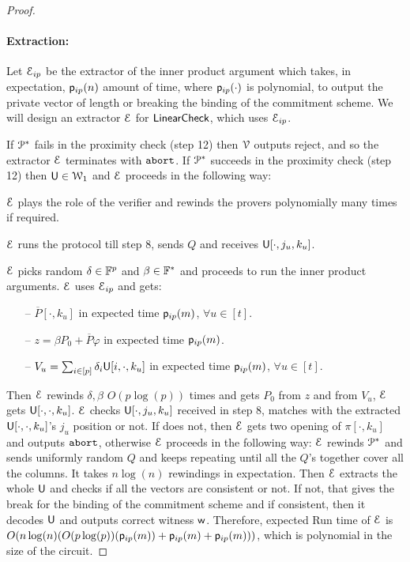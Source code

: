 \begin{proof}
	\smallskip
	\paragraph*{Extraction:} Let $\mathcal{E}_{ip}$ be the extractor of the inner product argument which takes, in expectation, $\mathsf{p}_{ip}(n)$ amount of time, where $\mathsf{p}_{ip}(\cdot)$ is polynomial, to output the private vector of length or breaking the binding of the commitment scheme. We will design an extractor $\mathcal{E}$ for $\mathsf{LinearCheck}$, which uses $\mathcal{E}_{ip}$.
	
	\smallskip
	If $\mathcal{P}^\ast$ fails in the proximity check (step 12) then $\mathcal{V}$ outputs reject, and so the extractor $\mathcal{E}$ terminates with $\texttt{abort}$.
	If $\mathcal{P}^\ast$ succeeds in the proximity check (step 12) then $\mathsf{U}\in \mathcal{W}_1$ and $\mathcal{E}$ proceeds in the following way:
	
	\smallskip
	$\mathcal{E}$ plays the role of the verifier and rewinds the provers polynomially many times if required.
	
	\smallskip
	$\mathcal{E}$ runs the protocol till step 8, sends $Q$ and receives $\mathsf{U}[\cdot, j_u,k_u]$. 
	
	$\mathcal{E}$ picks random $\delta\in \mathbb{F}^p$ and $\beta\in\mathbb{F}^\ast$ and proceeds to run the inner product arguments. $\mathcal{E}$ uses $\mathcal{E}_{ip}$ and gets:
	\begin{itemize}
		\item[--]  $\overline{P}[\cdot,k_u]$ in expected time $\mathsf{p}_{ip}(m)$, $\forall u\in[t]$.
		\item[--] $z=\beta P_0 + \overline{P}\varphi$ in expected time $\mathsf{p}_{ip}(m)$.
		\item[--] $V_u = \sum_{i\in[p]} \delta_i\mathsf{U}[i,\cdot,k_u]$ in expected time $\mathsf{p}_{ip}(m)$, $\forall u\in[t]$.
	\end{itemize}
	Then $\mathcal{E}$ rewinds $\delta, \beta$ $O(p\log(p))$ times and gets $P_0$ from $z$ and from $V_u$, $\mathcal{E}$ gets $\mathsf{U}[\cdot,\cdot,k_u]$. $\mathcal{E}$ checks $\mathsf{U}[\cdot,j_u,k_u]$ received in step 8, matches with the extracted $\mathsf{U}[\cdot,\cdot,k_u]$'s $j_u$ position or not. If does not, then $\mathcal{E}$ gets two opening of $\pi[\cdot,k_u]$ and outputs $\texttt{abort}$, otherwise $\mathcal{E}$ proceeds in the following way: $\mathcal{E}$ rewinds $\mathcal{P}^\ast$ and sends uniformly random $Q$ and keeps repeating until all the $Q$'s together cover all the columns. It takes $n\log(n)$ rewindings in expectation. Then $\mathcal{E}$ extracts the whole $\mathsf{U}$ and checks if all the vectors are consistent or not. If not, that gives the break for the binding of the commitment scheme and if consistent, then it decodes $\mathsf{U}$ and outputs correct witness $\mathsf{w}$.
	\smallskip
	Therefore, expected Run time of $\mathcal{E}$ is $O(n\log(n)(O(p\log(p))(\mathsf{p}_{ip}(m)) + \mathsf{p}_{ip}(m) + \mathsf{p}_{ip}(m))) $, which is polynomial in the size of the circuit.
\end{proof}

